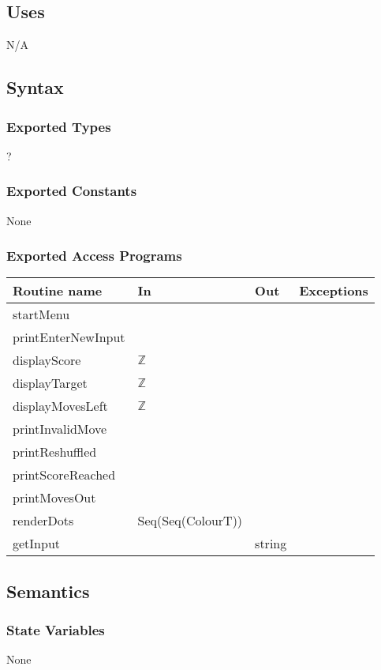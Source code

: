 \documentclass[12pt]{article}
\begin{document}
\subsection* {Uses}
N/A

\subsection* {Syntax}

\subsubsection* {Exported Types}
?

\subsubsection* {Exported Constants}
None

\subsubsection* {Exported Access Programs}

\begin{tabular}{| l | l | l | p{6cm} |}
\hline
\textbf{Routine name} & \textbf{In} & \textbf{Out} & \textbf{Exceptions}\\
\hline
startMenu & ~ & ~ & ~\\
\hline
printEnterNewInput & ~ & ~ & ~\\
\hline
displayScore & $\mathbb{Z}$ & ~ & ~\\
\hline
displayTarget & $\mathbb{Z}$ & ~ & ~\\
\hline
displayMovesLeft & $\mathbb{Z}$ & ~ & ~\\
\hline
printInvalidMove & ~ & ~ & ~\\
\hline
printReshuffled & ~ & ~ & ~ \\
\hline
printScoreReached & ~ & ~  & ~\\
\hline
printMovesOut & ~ & ~  & ~\\
\hline
renderDots & Seq(Seq(ColourT)) & ~  & ~\\
\hline
getInput & ~ & string & ~ \\
\hline
\end{tabular}

\subsection* {Semantics}

\subsubsection* {State Variables}
None
\end{document}
